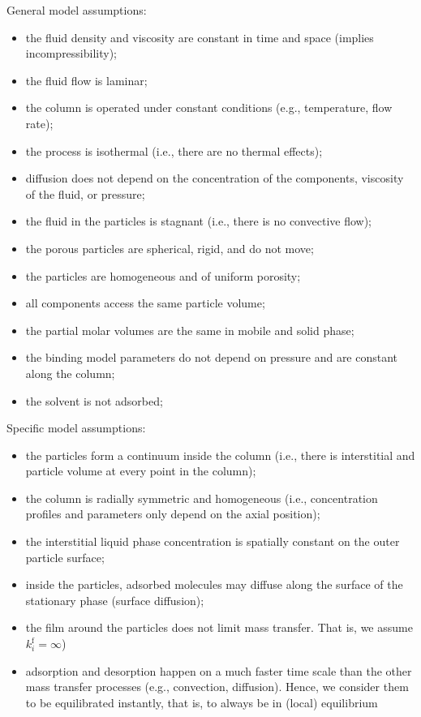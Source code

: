 \documentclass{article}
\begin{document}
General model assumptions:
\begin{itemize}
\item the fluid density and viscosity are constant in time and space (implies incompressibility);
\item the fluid flow is laminar;
\item the column is operated under constant conditions (e.g., temperature, flow rate);
\item the process is isothermal (i.e., there are no thermal effects);
\item diffusion does not depend on the concentration of the components, viscosity of the fluid, or pressure;
\item the fluid in the particles is stagnant (i.e., there is no convective flow);
\item the porous particles are spherical, rigid, and do not move;
\item the particles are homogeneous and of uniform porosity;
\item all components access the same particle volume;
\item the partial molar volumes are the same in mobile and solid phase;
\item the binding model parameters do not depend on pressure and are constant along the column;
\item the solvent is not adsorbed;
\end{itemize}


Specific model assumptions:
\begin{itemize}
\item the particles form a continuum inside the column (i.e., there is interstitial and particle volume at every point in the column);
\item the column is radially symmetric and homogeneous (i.e., concentration profiles and parameters only depend on the axial position);
\item the interstitial liquid phase concentration is spatially constant on the outer particle surface;
\item inside the particles, adsorbed molecules may diffuse along the surface of the stationary phase (surface diffusion);
\item the film around the particles does not limit mass transfer. That is, we assume $k^{\mathrm{f}}_i = \infty$)
\item adsorption and desorption happen on a much faster time scale than the other mass transfer processes (e.g., convection, diffusion). Hence, we consider them to be equilibrated instantly, that is, to always be in (local) equilibrium
\end{itemize}
\end{document}
